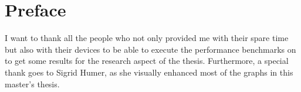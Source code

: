\chapter{Preface}

I want to thank all the people who not only provided me with their spare time but also with their devices to be able to execute the performance benchmarks on to get some results for the research aspect of the thesis. Furthermore, a special thank goes to Sigrid Humer, as she visually enhanced most of the graphs in this master's thesis.






